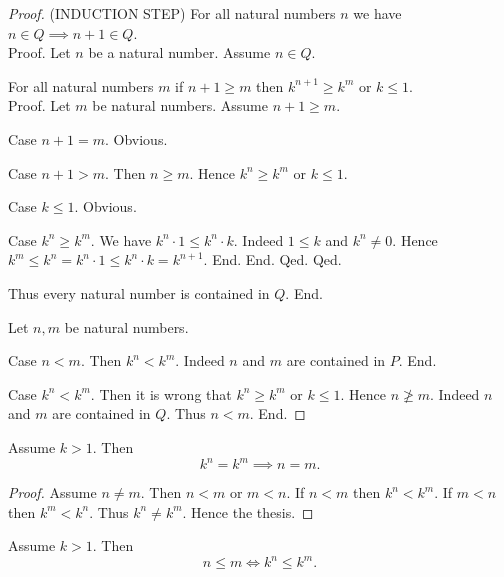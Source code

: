 \documentclass[../../natural-numbers.ftl.tex]{subfiles}
\begin{document}
\begin{forthel}
\begin{proof}
        (INDUCTION STEP) For all natural numbers $n$ we have $n \in Q \implies n + 1 \in Q$. \\
        Proof.
          Let $n$ be a natural number.
          Assume $n \in Q$.

          For all natural numbers $m$ if $n + 1 \geq m$ then $k^{n + 1} \geq k^{m}$ or $k \leq 1$. \\
          Proof.
            Let $m$ be natural numbers.
            Assume $n + 1 \geq m$.

            Case $n + 1 = m$. Obvious.

            Case $n + 1 > m$.
              Then $n \geq m$.
              Hence $k^{n} \geq k^{m}$ or $k \leq 1$.

              Case $k \leq 1$. Obvious.

              Case $k^{n} \geq k^{m}$.
                We have $k^{n} \cdot 1 \leq k^{n} \cdot k$.
                Indeed $1 \leq k$ and $k^{n} \neq 0$.
                Hence $k^{m} \leq k^{n} = k^{n} \cdot 1 \leq k^{n} \cdot k = k^{n + 1}$.
              End.
            End.
          Qed.
        Qed.

        Thus every natural number is contained in $Q$.
      End.


      Let $n,m$ be natural numbers.

      Case $n < m$.
        Then $k^{n} < k^{m}$.
        Indeed $n$ and $m$ are contained in $P$.
      End.

      Case $k^{n} < k^{m}$.
        Then it is wrong that $k^{n} \geq k^{m}$ or $k \leq 1$.
        Hence $n \ngeq m$.
        Indeed $n$ and $m$ are contained in $Q$.
        Thus $n < m$.
      End.
    \end{proof}


    \begin{corollary}[NN 02 04 837306]
      Assume $k > 1$.
      Then \[ k^{n} = k^{m} \implies n = m. \]
    \end{corollary}
    \begin{proof}
      Assume $n \neq m$.
      Then $n < m$ or $m < n$.
      If $n < m$ then $k^{n} < k^{m}$.
      If $m < n$ then $k^{m} < k^{n}$.
      Thus $k^{n} \neq k^{m}$.
      Hence the thesis.
    \end{proof}


    \begin{corollary}[NN 02 04 734298]
      Assume $k > 1$.
      Then \[ n \leq m \iff k^{n} \leq k^{m}. \]
    \end{corollary}
  \end{forthel}
\end{document}
